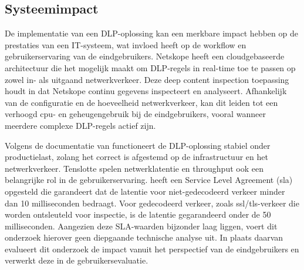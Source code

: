 \subsection{Systeemimpact}
\label{sec:systeemimpact-literatuurstudie}



De implementatie van een DLP-oplossing kan een merkbare impact hebben op de prestaties van een IT-systeem,
wat invloed heeft op de workflow en gebruikerservaring van de eindgebruikers. 
Netskope heeft een cloudgebaseerde architectuur die het mogelijk maakt om DLP-regels in real-time toe te passen op zowel in- als uitgaand netwerkverkeer.
Deze deep content inspection toepassing houdt in dat Netskope continu gegevens inspecteert en analyseert. 
Afhankelijk van de configuratie en de hoeveelheid netwerkverkeer, kan dit leiden tot een verhoogd \gls{cpu}- en geheugengebruik bij de eindgebruikers,
vooral wanneer meerdere complexe DLP-regels actief zijn.

Volgens de documentatie van \textcite{Netskope2025Utilization} functioneert de DLP-oplossing stabiel onder productielast, 
zolang het correct is afgestemd op de infrastructuur en het netwerkverkeer.
Tenslotte spelen netwerklatentie en throughput ook een belangrijke rol in de gebruikerservaring.
\textcite{Netskope2021SLA} heeft een Service Level Agreement (\gls{sla}) opgesteld die garandeert dat de latentie voor niet-gedecodeerd verkeer minder dan 10 milliseconden bedraagt.
Voor gedecodeerd verkeer, zoals \gls{ssl}/\gls{tls}-verkeer die worden ontsleuteld voor inspectie, is de latentie gegarandeerd onder de 50 milliseconden.
Aangezien deze SLA-waarden bijzonder laag liggen, voert dit onderzoek hierover geen diepgaande technische analyse uit.
In plaats daarvan evalueert dit onderzoek de impact vanuit het perspectief van de eindgebruikers en verwerkt deze in de gebruikersevaluatie.

